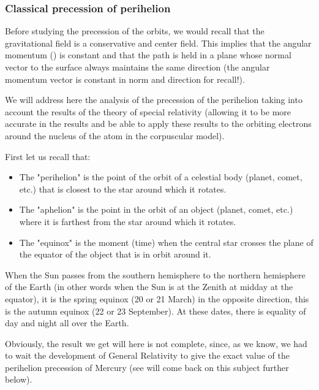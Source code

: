 	\subsubsection{Classical precession of perihelion}\label{classical precession of perihelion}
	Before studying the precession of the orbits, we would recall that the gravitational field is a conservative and center field. This implies that the angular momentum () is constant and that the path is held in a plane whose normal vector to the surface always maintains the same direction (the angular momentum vector is constant in norm and direction for recall!).

	We will address here the analysis of the precession of the perihelion taking into account the results of the theory of special relativity (allowing it to be more accurate in the results and be able to apply these results to the orbiting electrons around the nucleus of the atom in the corpuscular model).
	
	First let us recall that:
	\begin{itemize}
		\item The "perihelion" is the point of the orbit of a celestial body (planet, comet, etc.) that is closest to the star around which it rotates.

		\item The "aphelion" is the point in the orbit of an object (planet, comet, etc.) where it is farthest from the star around which it rotates.

		\item The "equinox" is the moment (time) when the central star crosses the plane of the equator of the object that is in orbit around it.
	\end{itemize}
	\begin{tcolorbox}[title=Remark,colframe=black,arc=10pt]
	When the Sun passes from the southern hemisphere to the northern hemisphere of the Earth (in other words when the Sun is at the Zenith at midday at the equator), it is the spring equinox (20 or 21 March) in the opposite direction, this is the autumn equinox (22 or 23 September). At these dates, there is equality of day and night all over the Earth.
	\end{tcolorbox}
	Obviously, the result we get will here is not complete, since, as we know, we had to wait the development of General Relativity to give the exact value of the perihelion  precession of Mercury (see will come back on this subject further below).

